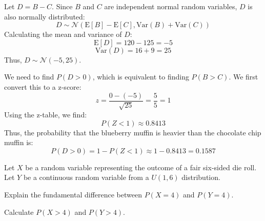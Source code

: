 \documentclass[a4paper, 10pt]{article}
\begin{document}
\begin{problem}
\end{problem}

\begin{solution}
Let \( D = B - C \). Since \( B \) and \( C \) are independent normal random variables, \( D \) is also normally distributed:
\[ D \sim \mathcal{N}(\text{E}[B] - \text{E}[C], \text{Var}(B) + \text{Var}(C)) \]
Calculating the mean and variance of \( D \):
\[ \text{E}[D] = 120 - 125 = -5 \]
\[ \text{Var}(D) = 16 + 9 = 25 \]
Thus, \( D \sim \mathcal{N}(-5, 25) \).

We need to find \( P(D > 0) \), which is equivalent to finding \( P(B > C) \).
We first convert this to a z-score:
\[ z = \frac{0 - (-5)}{\sqrt{25}} = \frac{5}{5} = 1 \]
Using the z-table, we find:
\[ P(Z < 1) \approx 0.8413 \]
Thus, the probability that the blueberry muffin is heavier than the chocolate chip muffin is:
\[ P(D > 0) = 1 - P(Z < 1) \approx 1 - 0.8413 = \boxed{0.1587} \]
\end{solution}

\newpage

\begin{problem}
Let \( X \) be a random variable representing the outcome of a fair six-sided die roll.
Let \( Y \) be a continuous random variable from a \( U(1, 6) \) distribution.
\begin{subproblems}
    \item Explain the fundamental difference between \( P(X = 4) \) and \( P(Y = 4) \).
    \item Calculate \( P(X > 4) \) and \( P(Y > 4) \).
\end{subproblems}
\end{problem}
\end{document}
